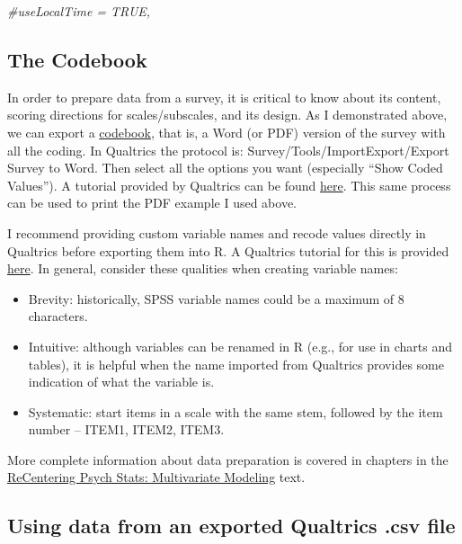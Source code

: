 \documentclass[
  english,
]{book}
\newenvironment{Shaded}{\begin{snugshade}}{\end{snugshade}}
\newcommand{\CommentTok}[1]{\textcolor[rgb]{0.56,0.35,0.01}{\textit{#1}}}
\providecommand{\tightlist}{%
  \setlength{\itemsep}{0pt}\setlength{\parskip}{0pt}}
\begin{document}
\begin{Shaded}
\begin{Highlighting}[]
\CommentTok{\#useLocalTime = TRUE,}
\end{Highlighting}
\end{Shaded}

\hypertarget{the-codebook}{%
\subsection{The Codebook}\label{the-codebook}}

In order to prepare data from a survey, it is critical to know about its content, scoring directions for scales/subscales, and its design. As I demonstrated above, we can export a \href{./Rate-a-Course_Codebook.pdf}{codebook}, that is, a Word (or PDF) version of the survey with all the coding. In Qualtrics the protocol is: Survey/Tools/ImportExport/Export Survey to Word. Then select all the options you want (especially ``Show Coded Values''). A tutorial provided by Qualtrics can be found \href{https://www.qualtrics.com/support/survey-platform/survey-module/survey-tools/import-and-export-surveys/}{here}. This same process can be used to print the PDF example I used above.

I recommend providing custom variable names and recode values directly in Qualtrics before exporting them into R. A Qualtrics tutorial for this is provided \href{https://www.qualtrics.com/support/survey-platform/survey-module/question-options/recode-values/}{here}. In general, consider these qualities when creating variable names:

\begin{itemize}
\tightlist
\item
  Brevity: historically, SPSS variable names could be a maximum of 8 characters.
\item
  Intuitive: although variables can be renamed in R (e.g., for use in charts and tables), it is helpful when the name imported from Qualtrics provides some indication of what the variable is.
\item
  Systematic: start items in a scale with the same stem, followed by the item number -- ITEM1, ITEM2, ITEM3.
\end{itemize}

More complete information about data preparation is covered in chapters in the \href{https://lhbikos.github.io/ReC_MultivariateModeling/}{ReCentering Psych Stats: Multivariate Modeling} text.

\hypertarget{using-data-from-an-exported-qualtrics-.csv-file}{%
\subsection{Using data from an exported Qualtrics .csv file}\label{using-data-from-an-exported-qualtrics-.csv-file}}
\end{document}
